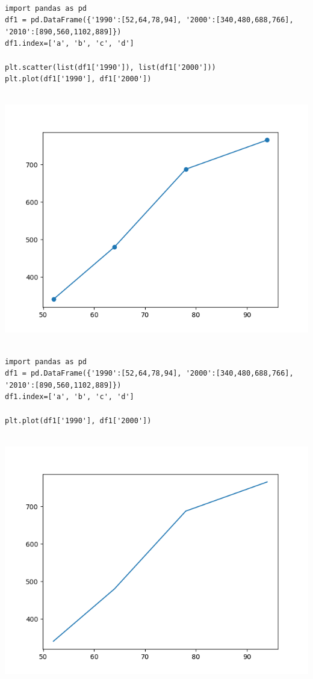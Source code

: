\documentclass[11pt]{article}
\begin{document}
\newpage
\begin{verbatim}

import pandas as pd
df1 = pd.DataFrame({'1990':[52,64,78,94], '2000':[340,480,688,766], '2010':[890,560,1102,889]})
df1.index=['a', 'b', 'c', 'd']

plt.scatter(list(df1['1990']), list(df1['2000']))
plt.plot(df1['1990'], df1['2000'])


\end{verbatim}

\begin{center}
\includegraphics[width=.9\linewidth]{fig8.png}
\end{center}

\newpage
\begin{verbatim}

import pandas as pd
df1 = pd.DataFrame({'1990':[52,64,78,94], '2000':[340,480,688,766], '2010':[890,560,1102,889]})
df1.index=['a', 'b', 'c', 'd']

plt.plot(df1['1990'], df1['2000'])


\end{verbatim}

\begin{center}
\includegraphics[width=.9\linewidth]{fig9.png}
\end{center}
\end{document}
